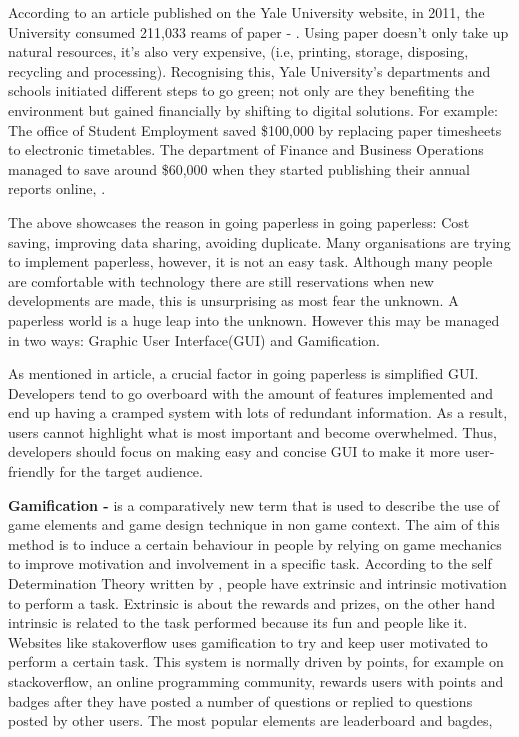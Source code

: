 According to an article published on the Yale University website, in 2011, the University consumed 211,033 reams of paper - . Using paper doesn’t only take up natural resources, it's also very expensive, (i.e, printing, storage, disposing, recycling and processing). Recognising this, Yale University's departments and schools initiated different steps to go green; not only are they benefiting the environment but gained financially by shifting to digital solutions. For example:
The office of Student Employment saved \$100,000 by replacing paper timesheets to electronic timetables.
The department of Finance and Business Operations managed to save around \$60,000 when they started publishing their annual reports online, \cite{Monday}.

The above showcases the reason in going paperless in going paperless:
Cost saving, improving data sharing, avoiding duplicate. 
Many organisations are trying to implement paperless, however, it is not an easy task. Although many people are comfortable with technology there are still reservations when new developments are made, this is unsurprising as most fear the unknown. A paperless world is a huge leap into the unknown. However this may be managed in two ways: Graphic User Interface(GUI) and Gamification.

As mentioned in \cite{7760717} article, a crucial factor in going paperless is simplified GUI. Developers tend to go overboard with the amount of features implemented and end up having a cramped system with lots of redundant information. As a result, users cannot highlight what is most important and become overwhelmed. Thus, developers should focus on making easy and concise GUI to make it more user-friendly for the target audience.

\textbf{Gamification - } is a comparatively new term that is used to describe the use of game elements and game design technique in non game context. The aim of this method is to induce a certain behaviour in people by relying on game mechanics to improve motivation and involvement in a specific task.
According to the self Determination Theory written by \cite{deci2008self}, people have extrinsic and intrinsic motivation to perform a task. Extrinsic is about the rewards and prizes, on the other hand intrinsic is related to the task performed because its fun and people like it. Websites like stakoverflow uses gamification to try and keep user motivated to perform a certain task.
This system is normally driven by points, for example on stackoverflow, an online programming community,  rewards users with points and badges after they have posted a number of questions or replied to questions posted by other users. The most popular elements are leaderboard and bagdes,

